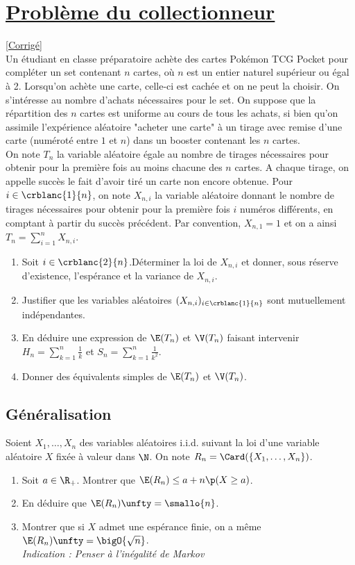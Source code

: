 \documentclass[8pt]{book}
\begin{document}
\section{\underline{Problème du collectionneur} }
\label{Problème du collectionneur}
\textcolor{blue}{\hyperref[Problème du collectionneur corrigé]{[Corrigé]}}\\
Un étudiant en classe préparatoire achète des cartes \textcopyright Pokémon TCG Pocket pour compléter un set contenant $n$ cartes, où $n$ est un entier naturel supérieur ou égal à 2. Lorsqu'on achète une carte, celle-ci est cachée et on ne peut la choisir. On s'intéresse au nombre d'achats nécessaires pour le set. On suppose que la répartition des $n$ cartes est uniforme au cours de tous les achats, si bien qu'on assimile l'expérience aléatoire "acheter une carte" à un tirage avec remise d'une carte (numéroté entre $1$ et $n$) dans un booster contenant les $n$ cartes.
\\On note $T_n$ la variable aléatoire égale au nombre de tirages nécessaires pour obtenir pour la première fois au moins chacune des $n$ cartes. A chaque tirage, on appelle succès le fait d'avoir tiré un carte non encore obtenue.
Pour $i\in\crblanc{1}{n}$, on note $X_{n,i}$ la variable aléatoire donnant le nombre de tirages nécessaires pour obtenir pour la première fois $i$ numéros différents, en comptant à partir du succès précédent. Par convention, $X_{n,1}=1$ et on a ainsi $T_n=\displaystyle\sum\limits_{i=1}^nX_{n,i}$.
\begin{enumerate}
	\item Soit $i\in\crblanc{2}{n}$.Déterminer la loi de $X_{n,i}$ et donner, sous réserve d'existence, l'espérance et la variance de $X_{n,i}$.
	\item Justifier que les variables aléatoires $(X_{n,i})_{i\in\crblanc{1}{n}}$ sont mutuellement indépendantes.
	\item En déduire une expression de $\E(T_n)$ et $\V(T_n)$ faisant intervenir $H_n=\displaystyle\sum\limits_{k=1}^n\frac{1}{k}$ et $S_n=\displaystyle\sum\limits_{k=1}^n\frac{1}{k^2}$.
	\item Donner des équivalents simples de $\E(T_n)$ et $\V(T_n)$.
\end{enumerate}

\subsection{Généralisation}
Soient $X_1,\dots,X_n$ des variables aléatoires i.i.d. suivant la loi d'une variable aléatoire $X$ fixée à valeur dans $\N$. On note $R_n=\Card(\{X_1,\dots,X_n\})$.
\begin{enumerate}
	\item Soit $a\in \R_+$. Montrer que $\E(R_n)\leq a+n\p(X\geq a)$.
	\item En déduire que $\E(R_n)\unfty=\smallo{n}$.
	\item Montrer que si $X$ admet une espérance finie, on a même $\E(R_n)\unfty=\bigO{\sqrt n}$.\\
	\textit{Indication : Penser à l'inégalité de Markov}
\end{enumerate}
\end{document}
